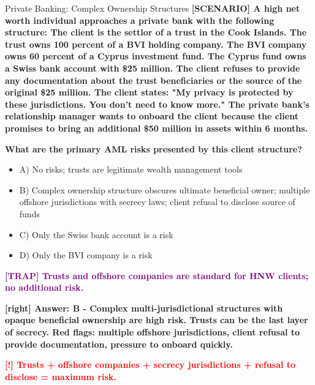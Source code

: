 \documentclass[11pt,a4paper]{beamer}
\newcommand{\redflag}[1]{\textcolor{red}{\textbf{[!] #1}}}
\newcommand{\trap}[1]{\textcolor{purple}{\textbf{[TRAP] #1}}}
\newcommand{\correct}[1]{\textcolor{green!50!black}{\textbf{[right] #1}}}
\newcommand{\scenario}[1]{\textcolor{blue!70!black}{\textbf{[SCENARIO] #1}}}
\begin{document}
	
	\begin{frame}{Private Banking: Complex Ownership Structures}
		\tiny
		\scenario{A high net worth individual approaches a private bank with the following structure: The client is the settlor of a trust in the Cook Islands. The trust owns 100 percent of a BVI holding company. The BVI company owns 60 percent of a Cyprus investment fund. The Cyprus fund owns a Swiss bank account with \$25 million. The client refuses to provide any documentation about the trust beneficiaries or the source of the original \$25 million. The client states: "My privacy is protected by these jurisdictions. You don't need to know more." The private bank's relationship manager wants to onboard the client because the client promises to bring an additional \$50 million in assets within 6 months.}
		
		\vspace{0.02cm}
		\textbf{What are the primary AML risks presented by this client structure?}
		\vspace{0.02cm}
		
		\begin{itemize}
			\item A) No risks; trusts are legitimate wealth management tools
			\item B) Complex ownership structure obscures ultimate beneficial owner; multiple offshore jurisdictions with secrecy laws; client refusal to disclose source of funds
			\item C) Only the Swiss bank account is a risk
			\item D) Only the BVI company is a risk
		\end{itemize}
		
		\vspace{0.02cm}
		\trap{Trusts and offshore companies are standard for HNW clients; no additional risk.}
		
		\vspace{0.02cm}
		\correct{Answer: B - Complex multi-jurisdictional structures with opaque beneficial ownership are high risk. Trusts can be the last layer of secrecy. Red flags: multiple offshore jurisdictions, client refusal to provide documentation, pressure to onboard quickly.}
		
		\vspace{0.02cm}
		\redflag{Trusts + offshore companies + secrecy jurisdictions + refusal to disclose = maximum risk.}
	\end{frame}
	
\end{document}
